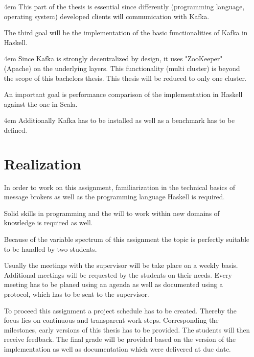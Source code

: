 \par
\begingroup
\leftskip4em
\rightskip\leftskip
This part of the thesis is essential since differently (programming language,
operating system) developed clients will communication with Kafka.
\par
\endgroup
The third goal will be the implementation of the basic functionalities of Kafka
in Haskell.

\par
\begingroup
\leftskip4em
\rightskip\leftskip
Since Kafka is strongly decentralized by design, it uses "ZooKeeper" (Apache) on
the underlying layers. This functionality (multi cluster) is beyond the scope of
this bachelors thesis. This thesis will be reduced to only one cluster.
\par
\endgroup
An important goal is performance comparison of the implementation in Haskell
against the one in Scala.

\par
\begingroup
\leftskip4em
\rightskip\leftskip
Additionally Kafka has to be installed as well as a benchmark has to be defined.
\par
\endgroup

\section*{Realization}

In order to work on this assignment, familiarization in the technical basics of
message brokers as well as the programming language Haskell is required.

Solid skills in programming and the will to work within new domains of knowledge
is required as well.

Because of the variable spectrum of this assignment the topic is perfectly
suitable to be handled by two students.

Usually the meetings with the supervisor will be take place on a weekly basis.
Additional meetings will be requested by the students on their needs. Every
meeting has to be planed using an agenda as well as documented using a protocol,
which has to be sent to the supervisor.

To proceed this assignment a project schedule has to be created. Thereby the
focus lies on continuous and transparent work steps. Corresponding the
milestones, early versions of this thesis has to be provided. The students will
then receive feedback. The final grade will be provided based on the version of
the implementation as well as documentation which were delivered at due date.

